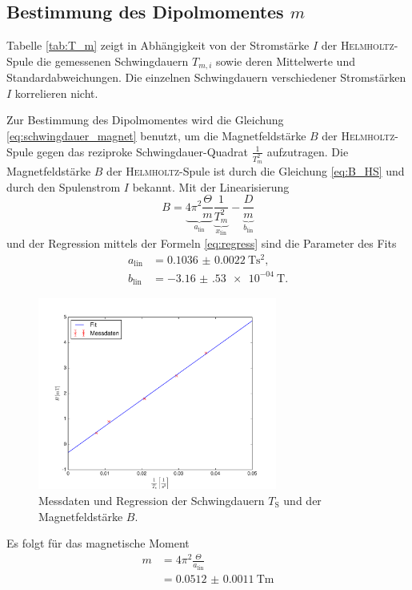 \subsection{Bestimmung des Dipolmomentes \texorpdfstring{$m$}{m}}
\label{sec:auswertung2}
Tabelle \ref{tab:T_m} zeigt in Abhängigkeit von der Stromstärke $I$ der \textsc{Helmholtz}-Spule die gemessenen Schwingdauern $T_{m,i}$ sowie deren Mittelwerte und Standardabweichungen. 
Die einzelnen Schwingdauern verschiedener Stromstärken $I$ korrelieren nicht.

Zur Bestimmung des Dipolmomentes wird die Gleichung \eqref{eq:schwingdauer_magnet} benutzt, um die Magnetfeldstärke $B$ 
der \textsc{Helmholtz}-Spule gegen das reziproke Schwingdauer-Quadrat $\frac{1}{T_{m}^2}$ aufzutragen.
Die Magnetfeldstärke $B$ der \textsc{Helmholtz}-Spule ist durch die Gleichung \eqref{eq:B_HS} und durch den Spulenstrom $I$ bekannt.
Mit der Linearisierung
\begin{equation}
	B = \underbrace{4\pi^2\frac{\Theta}{m}}_{a_\text{lin}} \underbrace{\frac{1}{T_m^2}}_{x_\text{lin}} - \underbrace{\frac{D}{m}}_{b_\text{lin}}
	\label{eq:B_lin}
\end{equation}
und der Regression mittels der Formeln \eqref{eq:regress}
sind die Parameter des Fits
\begin{align}
	a_\text{lin}&=	\SI{0.1036(22)}{\tesla\second\squared}, \\
	b_\text{lin}&=	-\SI{3.16(53)e-04}{\tesla}.
\end{align}
\begin{figure}[p]
	\centering
	\includegraphics[width=0.7\textwidth]{Bilder/Magnetfeld.pdf}
	\caption{Messdaten und Regression der Schwingdauern $T_\text{S}$ und der Magnetfeldstärke $B$.}
	\label{fig:Magnetfeld}
\end{figure}
Es folgt für das magnetische Moment
\begin{align}
	m 	&= 4\pi^2\frac{\Theta}{a_\text{lin}}\\
		&= \SI{0.0512(11)}{\tesla\meter}
	\label{eq:Magnetmoment_lin}
\end{align}
